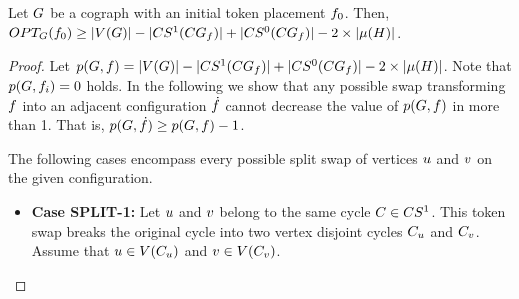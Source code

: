 \documentclass[msc,english,table,xcdraw]{ppgccufmg}
\begin{document}

\begin{lemma}
\label{lem:lb_cograph}
Let $G$ be a cograph with an initial token placement $f_{0}$.
Then, $OPT_{G}(f_{0}) \geq |V(G)| - 
|CS^{1}(CG_{f})| +
|CS^{0}(CG_{f})| - 2\times|\mu(H)|$.
\end{lemma}

\begin{proof}
Let $p(G, f) = |V(G)| - 
|CS^{1}(CG_{f})| +
|CS^{0}(CG_{f})| - 2\times|\mu(H)|$.
Note that $p(G, f_{i}) = 0$ holds.
In the following we show that any possible swap transforming $f$ into an adjacent configuration $\dot{f}$ cannot decrease the value of $p(G, f)$ in more than 1. That is, $p(G, \dot{f}) \ge p(G, f) - 1$. 

The following cases encompass every possible split swap of vertices $u$ and $v$ on the given configuration.

\begin{itemize}
    \item \textbf{Case SPLIT-1:} Let $u$ and $v$ belong to 
    the same cycle $C \in CS^{1}$. 
    This token swap breaks the original cycle into two vertex disjoint cycles  $C_{u}$ and $C_{v}$.
    Assume that $u \in V(C_{u})$ and 
    $v \in V(C_{v})$.
    

\end{itemize}
\end{proof}
\end{document}
